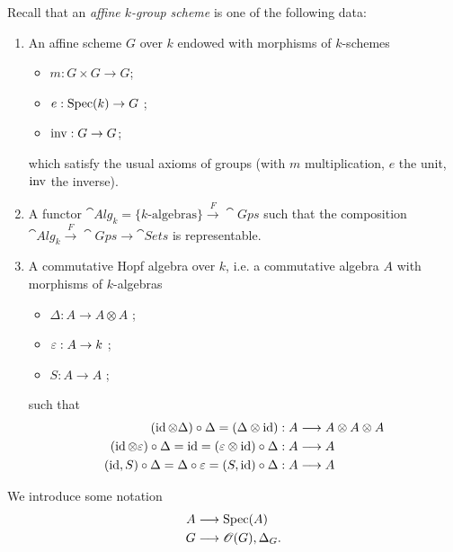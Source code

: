 Recall that an \emph{affine $k$-group scheme} is one of the following data:
\begin{enumerate}[(1)]
	\item An affine scheme $G$ over $k$ endowed with morphisms of $k$-schemes
		\begin{itemize}
			\item $m:G\times G\to G$; 
			\item $e:\Spec(k)\to G$ ;
			\item $\i:G\to G$;
		\end{itemize}
		which satisfy the usual axioms of groups (with $m$ multiplication, $e$ the unit, $\operatorname{inv}$ the inverse).
	\item A functor $\cat{Alg}_k = \{k\text{-algebras}\} \xrightarrow{F} \cat{Gps}$ such that the composition $\cat{Alg}_k \xrightarrow{F}\cat{Gps}\to \cat{Sets}$ is representable.
	\item A commutative Hopf algebra over $k$, i.e. a commutative algebra $A$ with morphisms of $k$-algebras
		\begin{itemize}
			\item $\Delta:A \to A\otimes A$ ;
			\item $\eps:A\to k$ ;
			\item $S:A\to A$ ;
		\end{itemize}
		such that
		\begin{align*}
			(\id \otimes\Delta) \circ \Delta = (\Delta \otimes \id) &: A \to A\otimes A \otimes A \\
			(\id\otimes \eps) \circ \Delta = \id = (\eps\otimes\id)\circ\Delta &: A \to A \\
			(\id,S)\circ \Delta = \Delta \circ \eps = (S,\id)\circ\Delta &:A \to A
		\end{align*}
\end{enumerate}
We introduce some notation
\begin{align*}
	A &\to \Spec(A) \\
	G &\to \OO(G), \Delta_G.
\end{align*}
